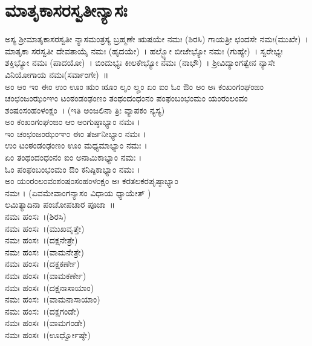 \section{ಮಾತೃಕಾಸರಸ್ವತೀನ್ಯಾಸಃ}
ಅಸ್ಯ ಶ್ರೀಮಾತೃಕಾಸರಸ್ವತೀ ನ್ಯಾಸಮಂತ್ರಸ್ಯ ಬ್ರಹ್ಮಣೇ ಋಷಯೇ ನಮಃ (ಶಿರಸಿ) ಗಾಯತ್ರೀ ಛಂದಸೇ ನಮಃ(ಮುಖೇ)~। ಮಾತೃಕಾ ಸರಸ್ವತೀ ದೇವತಾಯೈ ನಮಃ (ಹೃದಯೇ)~। ಹಲ್ಭ್ಯೋ ಬೀಜೇಭ್ಯೋ ನಮಃ (ಗುಹ್ಯೇ)~। ಸ್ವರೇಭ್ಯಃ ಶಕ್ತಿಭ್ಯೋ ನಮಃ (ಪಾದಯೋ)~। ಬಿಂದುಭ್ಯಃ ಕೀಲಕೇಭ್ಯೋ ನಮಃ (ನಾಭೌ)~। ಶ್ರೀವಿದ್ಯಾಂಗತ್ವೇನ ನ್ಯಾಸೇ ವಿನಿಯೋಗಾಯ ನಮಃ(ಸರ್ವಾಂಗೇ)~॥\\
ಅಂ ಆಂ ಇಂ ಈಂ ಉಂ ಊಂ ಋಂ ೠಂ ಲೃಂ ಲೄಂ ಏಂ ಐಂ ಓಂ ಔಂ ಅಂ ಅಃ ಕಂಖಂಗಂಘಂಙಂ ಚಂಛಂಜಂಝಂಞಂ ಟಂಠಂಡಂಢಂಣಂ ತಂಥಂದಂಧಂನಂ ಪಂಫಂಬಂಭಂಮಂ ಯಂರಂಲಂವಂ ಶಂಷಂಸಂಹಂಳಂಕ್ಷಂ~। (ಇತಿ ಅಂಜಲಿನಾ ತ್ರಿಃ ವ್ಯಾಪಕಂ ನ್ಯಸ್ಯ)\\
 ಅಂ ಕಂಖಂಗಂಘಂಙಂ ಆಂ ಅಂಗುಷ್ಠಾಭ್ಯಾಂ ನಮಃ ।\\
 ಇಂ ಚಂಛಂಜಂಝಂಞಂ ಈಂ ತರ್ಜನೀಭ್ಯಾಂ ನಮಃ ।\\
 ಉಂ ಟಂಠಂಡಂಢಂಣಂ ಊಂ ಮಧ್ಯಮಾಭ್ಯಾಂ ನಮಃ ।\\
 ಏಂ ತಂಥಂದಂಧಂನಂ ಐಂ ಅನಾಮಿಕಾಭ್ಯಾಂ ನಮಃ ।\\
 ಓಂ ಪಂಫಂಬಂಭಂಮಂ ಔಂ ಕನಿಷ್ಠಿಕಾಭ್ಯಾಂ ನಮಃ ।\\
 ಅಂ ಯಂರಂಲಂವಂಶಂಷಂಸಂಹಂಳಂಕ್ಷಂ ಅಃ ಕರತಲಕರಪೃಷ್ಠಾಭ್ಯಾಂ\\ ನಮಃ ।
(ಏವಮೇವಾಂಗನ್ಯಾಸಂ ವಿಧಾಯ ಧ್ಯಾಯೇತ್ )
\newpage
{}\\
ಲಮಿತ್ಯಾದಿನಾ ಪಂಚೋಪಚಾರ ಪೂಜಾ~॥\\
 ನಮಃ ಹಂಸಃ~।(ಶಿರಸಿ)\\
 ನಮಃ ಹಂಸಃ~।(ಮುಖವೃತ್ತೇ)\\
 ನಮಃ ಹಂಸಃ~।(ದಕ್ಷನೇತ್ರೇ)\\
 ನಮಃ ಹಂಸಃ~।(ವಾಮನೇತ್ರೇ)\\
 ನಮಃ ಹಂಸಃ~।(ದಕ್ಷಕರ್ಣೇ)\\
 ನಮಃ ಹಂಸಃ~।(ವಾಮಕರ್ಣೇ)\\
 ನಮಃ ಹಂಸಃ~।(ದಕ್ಷನಾಸಾಯಾಂ)\\
 ನಮಃ ಹಂಸಃ~।(ವಾಮನಾಸಾಯಾಂ)\\
 ನಮಃ ಹಂಸಃ~।(ದಕ್ಷಗಂಡೇ)\\
 ನಮಃ ಹಂಸಃ~।(ವಾಮಗಂಡೇ)\\
 ನಮಃ ಹಂಸಃ~।(ಊರ್ಧ್ವೋಷ್ಠೇ)\\
